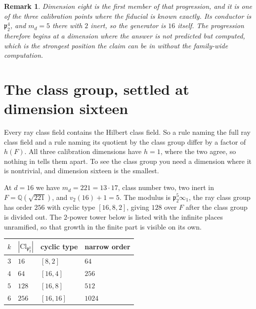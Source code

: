 \documentclass[12pt,a4paper]{article}
\newtheorem{remark}[theorem]{Remark}
\newcommand{\Fd}{F}
\newcommand{\md}{m_d}
\newcommand{\pt}{\mathfrak{p}_2}
\newcommand{\Cl}{\mathrm{Cl}}
\begin{document}
\begin{remark}
Dimension eight is the first member of that progression, and it is one of the
three calibration points where the fiducial is known exactly. Its conductor is
$\pt^{4}$, and $\md = 5$ there with $2$ inert, so the generator is $16$ itself.
The progression therefore begins at a dimension where the answer is not
predicted but computed, which is the strongest position the claim can be in
without the family-wide computation.
\end{remark}

\section{The class group, settled at dimension sixteen}
\label{sec:classgroup}

Every ray class field contains the Hilbert class field. So a rule naming the
full ray class field and a rule naming its quotient by the class group differ by
a factor of $h(\Fd)$. All three calibration dimensions have $h=1$, where the two
agree, so nothing in  tells them apart. To see the class
group you need a dimension where it is nontrivial, and dimension sixteen is the
smallest.

At $d=16$ we have $\md = 221 = 13\cdot 17$, class number two, two inert in
$\Fd = \mathbb{Q}(\sqrt{221})$, and $v_2(16)+1 = 5$. The modulus is
$\pt^5\infty_1$, the ray class group has order $256$ with cyclic type $[16,8,2]$,
giving $128$ over $\Fd$ after the class group is divided out. The $2$-power
tower below is listed with the infinite places unramified, so that growth in the
finite part is visible on its own.

\begin{center}
\begin{tabular}{@{}clll@{}}
\toprule
$k$ & $|\Cl_{\pt^k}|$ & cyclic type & narrow order \\
\midrule
$3$ & $16$  & $[8,2]$   & $64$ \\
$4$ & $64$  & $[16,4]$  & $256$ \\
$5$ & $128$ & $[16,8]$  & $512$ \\
$6$ & $256$ & $[16,16]$ & $1024$ \\
\bottomrule
\end{tabular}
\end{center}
\end{document}
